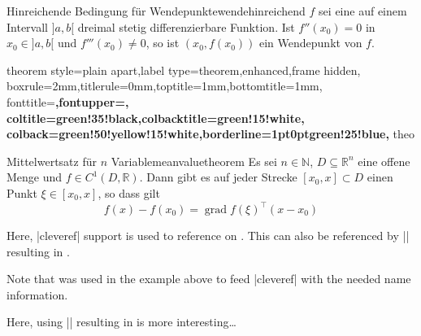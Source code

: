 \begin{dispExample}
\begin{Theorem}[boxrule=2mm,toptitle=-1.5mm,bottomtitle=-1.5mm]{%
    Hinreichende Bedingung f\"{u}r Wendepunkte}{wendehinreichend}%
  $f$ sei eine auf einem Intervall $]a,b[$ dreimal stetig differenzierbare Funktion.
  Ist $f''(x_0)=0$ in $x_0\in]a,b[$ und $f'''(x_0)\ne 0$, so ist
  $(x_0,f(x_0))$ ein Wendepunkt von $f$.
\end{Theorem}
\end{dispExample}

\begin{dispExample}
%
  {theorem style=plain apart,label type=theorem,enhanced,frame hidden,
  boxrule=2mm,titlerule=0mm,toptitle=1mm,bottomtitle=1mm,
  fonttitle=\bfseries\large,fontupper=\normalsize,
  coltitle=green!35!black,colbacktitle=green!15!white,
  colback=green!50!yellow!15!white,borderline={1pt}{0pt}{green!25!blue},
  }{theo}

\begin{YetAnotherTheorem}{Mittelwertsatz f\"{u}r $n$ Variable}{meanvaluetheorem}%
  Es sei $n\in\mathbb{N}$, $D\subseteq\mathbb{R}^n$ eine offene Menge und
  $f\in C^{1}(D,\mathbb{R})$. Dann gibt es auf jeder Strecke
  $[x_0,x]\subset D$ einen Punkt $\xi\in[x_0,x]$, so dass gilt
  \begin{equation*}
  f(x)-f(x_0) = \operatorname{grad} f(\xi)^{\top}(x-x_0)
  \end{equation*}
\end{YetAnotherTheorem}

\medskip
Here, |cleveref| support is used to reference 
on . This 
can also be referenced by |\Vref| resulting in .
\end{dispExample}

\begin{marker}
Note that  was used in the example above to feed
|cleveref| \cite{cubitt:2013a} with the needed name information.
\end{marker}

\clearpage

\begin{dispExample}
Here, using |\Vref| resulting in  is more interesting\ldots
\end{dispExample}


